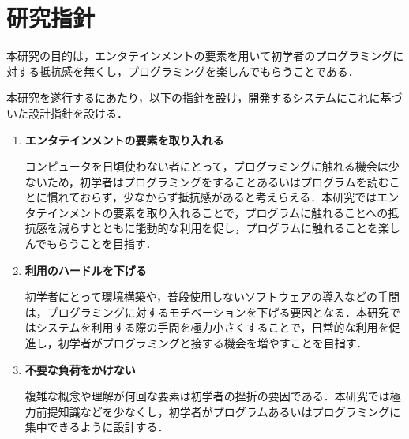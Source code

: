 \section{研究指針}

本研究の目的は，エンタテインメントの要素を用いて初学者のプログラミングに対する抵抗感を無くし，プログラミングを楽しんでもらうことである．

本研究を遂行するにあたり，以下の指針を設け，開発するシステムにこれに基づいた設計指針を設ける．

\begin{enumerate}
  \item {\bf エンタテインメントの要素を取り入れる}

  コンピュータを日頃使わない者にとって，プログラミングに触れる機会は少ないため，初学者はプログラミングをすることあるいはプログラムを読むことに慣れておらず，少なからず抵抗感があると考えらえる．本研究ではエンタテインメントの要素を取り入れることで，プログラムに触れることへの抵抗感を減らすとともに能動的な利用を促し，プログラムに触れることを楽しんでもらうことを目指す．

  \item {\bf 利用のハードルを下げる}

  初学者にとって環境構築や，普段使用しないソフトウェアの導入などの手間は，プログラミングに対するモチベーションを下げる要因となる．本研究ではシステムを利用する際の手間を極力小さくすることで，日常的な利用を促進し，初学者がプログラミングと接する機会を増やすことを目指す．

  \item {\bf 不要な負荷をかけない}

  複雑な概念や理解が何回な要素は初学者の挫折の要因である．本研究では極力前提知識などを少なくし，初学者がプログラムあるいはプログラミングに集中できるように設計する．
\end{enumerate}